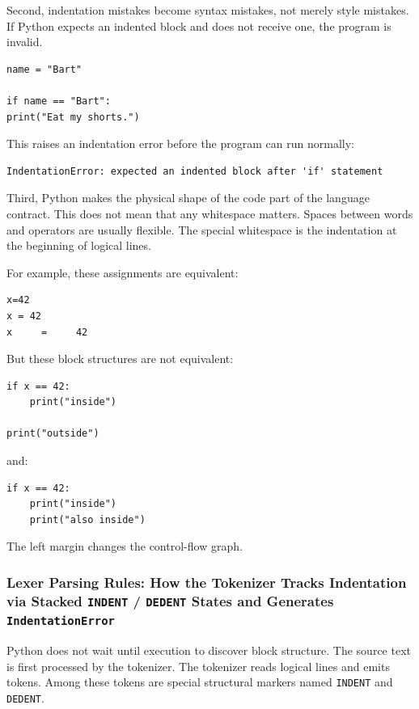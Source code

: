 Second, indentation mistakes become syntax mistakes, not merely style mistakes. If Python expects an indented block and does not receive one, the program is invalid.

\begin{verbatim}
name = "Bart"

if name == "Bart":
print("Eat my shorts.")
\end{verbatim}

This raises an indentation error before the program can run normally:

\begin{verbatim}
IndentationError: expected an indented block after 'if' statement
\end{verbatim}

Third, Python makes the physical shape of the code part of the language contract. This does not mean that any whitespace matters. Spaces between words and operators are usually flexible. The special whitespace is the indentation at the beginning of logical lines.

For example, these assignments are equivalent:

\begin{verbatim}
x=42
x = 42
x     =     42
\end{verbatim}

But these block structures are not equivalent:

\begin{verbatim}
if x == 42:
    print("inside")

print("outside")
\end{verbatim}

and:

\begin{verbatim}
if x == 42:
    print("inside")
    print("also inside")
\end{verbatim}

The left margin changes the control-flow graph.

\subsubsection{Lexer Parsing Rules: How the Tokenizer Tracks Indentation via Stacked \texttt{INDENT} / \texttt{DEDENT} States and Generates \texttt{IndentationError}}

Python does not wait until execution to discover block structure. The source text is first processed by the tokenizer. The tokenizer reads logical lines and emits tokens. Among these tokens are special structural markers named \texttt{INDENT} and \texttt{DEDENT}.

